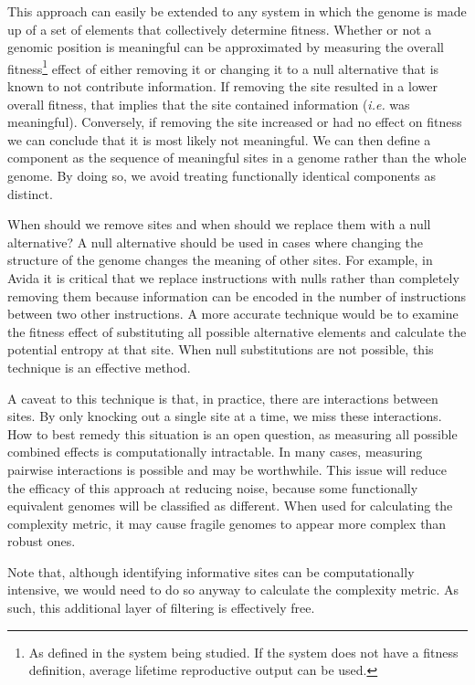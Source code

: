\documentclass[letterpaper]{article}
\begin{document}
This approach can easily be extended to any system in which the genome is made up of a set of elements that collectively determine fitness. Whether or not a genomic position is meaningful can be approximated by measuring the overall fitness\footnote{As defined in the system being studied. If the system does not have a fitness definition, average lifetime reproductive output can be used.} effect of either removing it or changing it to a null alternative that is known to not contribute information. If removing the site resulted in a lower overall fitness, that implies that the site contained information (\textit{i.e.} was meaningful). Conversely, if removing the site increased or had no effect on fitness we can conclude that it is most likely not meaningful. We can then define a component as the sequence of meaningful sites in a genome rather than the whole genome. By doing so, we avoid treating functionally identical components as distinct. 

When should we remove sites and when should we replace them with a null alternative? A null alternative should be used in cases where changing the structure of the genome changes the meaning of other sites. For example, in Avida it is critical that we replace instructions with nulls rather than completely removing them because information can be encoded in the number of instructions between two other instructions. A more accurate technique would be to examine the fitness effect of substituting all possible alternative elements and calculate the potential entropy at that site. When null substitutions are not possible, this technique is an effective method. 

A caveat to this technique is that, in practice, there are interactions between sites. By only knocking out a single site at a time, we miss these interactions. How to best remedy this situation is an open question, as measuring all possible combined effects is computationally intractable. In many cases, measuring pairwise interactions is possible and may be worthwhile. This issue will reduce the efficacy of this approach at reducing noise, because some functionally equivalent genomes will be classified as different. When used for calculating the complexity metric, it may cause fragile genomes to appear more complex than robust ones. 

Note that, although identifying informative sites can be computationally intensive, we would need to do so anyway to calculate the complexity metric. As such, this additional layer of filtering is effectively free.
\end{document}
